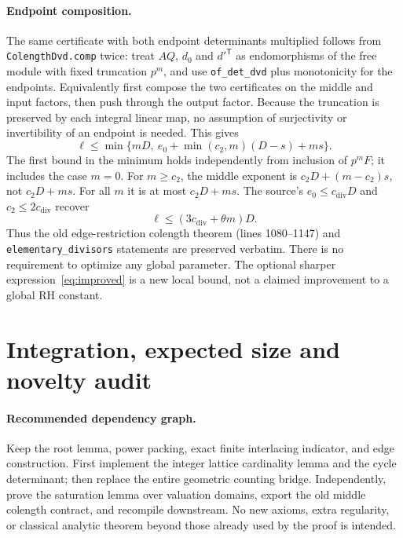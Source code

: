 \documentclass[11pt]{article}
\theoremstyle{remark}\newtheorem{remark}[theorem]{Remark}
\newcommand{\code}[1]{\texttt{#1}}
\begin{document}
\paragraph{Endpoint composition.} The same certificate with both endpoint determinants multiplied follows from \code{ColengthDvd.comp} twice: treat $AQ$, $d_0$ and $d'^{\mathsf T}$ as endomorphisms of the free module with fixed truncation $p^m$, and use \code{of\_det\_dvd} plus monotonicity for the endpoints. Equivalently first compose the two certificates on the middle and input factors, then push through the output factor. Because the truncation is preserved by each integral linear map, no assumption of surjectivity or invertibility of an endpoint is needed. This gives
\begin{equation}\label{eq:improved}
 \ell\leq \min\{mD,\ e_0+\min(c_2,m)(D-s)+ms\}.
\end{equation}
The first bound in the minimum holds independently from inclusion of $p^mF$; it includes the case $m=0$. For $m\geq c_2$, the middle exponent is $c_2D+(m-c_2)s$, not $c_2D+ms$. For all $m$ it is at most $c_2D+ms$. The source's $e_0\leq c_{\mathrm{div}}D$ and $c_2\leq2c_{\mathrm{div}}$ recover
\[
 \ell\leq(3c_{\mathrm{div}}+\theta m)D.
\]
Thus the old edge-restriction colength theorem (lines 1080--1147) and \code{elementary\_divisors} statements are preserved verbatim. There is no requirement to optimize any global parameter. The optional sharper expression~\eqref{eq:improved} is a new local bound, not a claimed improvement to a global RH constant.

\section{Integration, expected size and novelty audit}
\paragraph{Recommended dependency graph.} Keep the root lemma, power packing, exact finite interlacing indicator, and edge construction. First implement the integer lattice cardinality lemma and the cycle determinant; then replace the entire geometric counting bridge. Independently, prove the saturation lemma over valuation domains, export the old middle colength contract, and recompile downstream. No new axioms, extra regularity, or classical analytic theorem beyond those already used by the proof is intended.
\end{document}
